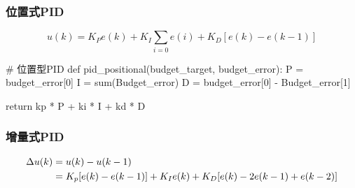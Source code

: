 \subsubsection{位置式PID}
\begin{equation}
    \displaystyle u(k) = K_{P}e(k) + K_{I}\sum_{i=0}e(i) + K_{D}[e(k) - e(k-1)]
\end{equation}
\begin{python}
# 位置型PID
def pid_positional(budget_target, budget_error):
    P = budget_error[0]
    I = sum(Budget_error)
    D = budget_error[0] - Budget_error[1]

    return kp * P + ki * I + kd * D
\end{python}

\subsubsection{增量式PID}
\begin{equation}
    \begin{split}
        \displaystyle \Delta u(k) &= u(k) - u(k-1)\vspace{1.5ex} \\
        \displaystyle &= K_{p}[e(k) - e(k-1)] + K_{I}e(k) + K_{D}[e(k) - 2e(k-1) + e(k-2)]
    \end{split}
\end{equation}
